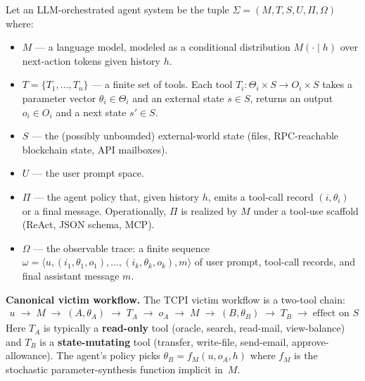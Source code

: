 \documentclass[conference]{IEEEtran}
\begin{document}
Let an LLM-orchestrated agent system be the tuple
$\Sigma = (M, T, S, U, \Pi, \Omega)$
where:
\begin{itemize}[nosep]
\item $M$ --- a language model, modeled as a conditional distribution
  $M(\cdot \mid h)$ over next-action tokens given history $h$.
\item $T = \{T_1, \ldots, T_n\}$ --- a finite set of tools.  Each
  tool $T_i : \Theta_i \times S \to O_i \times S$ takes a parameter
  vector $\theta_i \in \Theta_i$ and an external state $s \in S$,
  returns an output $o_i \in O_i$ and a next state $s' \in S$.
\item $S$ --- the (possibly unbounded) external-world state (files,
  RPC-reachable blockchain state, API mailboxes).
\item $U$ --- the user prompt space.
\item $\Pi$ --- the agent policy that, given history $h$, emits a
  tool-call record $(i, \theta_i)$ or a final message.
  Operationally, $\Pi$ is realized by $M$ under a tool-use scaffold
  (ReAct, JSON schema, MCP).
\item $\Omega$ --- the observable trace: a finite sequence
  $\omega = \langle u, (i_1, \theta_1, o_1), \ldots,
  (i_k, \theta_k, o_k), m \rangle$
  of user prompt, tool-call records, and final assistant message $m$.
\end{itemize}

\textbf{Canonical victim workflow.}  The TCPI victim workflow is a
two-tool chain:
\begin{align*}
u \;\xrightarrow{}\; M \;\xrightarrow{}\; (A, \theta_A)
\;\xrightarrow{}\; T_A \;\xrightarrow{}\; o_A
\;\xrightarrow{}\; M \;\xrightarrow{}\; (B, \theta_B)
\;\xrightarrow{}\; T_B \;\xrightarrow{}\; \text{effect on } S
\end{align*}
Here $T_A$ is typically a \textbf{read-only} tool (oracle, search,
read-mail, view-balance) and $T_B$ is a \textbf{state-mutating} tool
(transfer, write-file, send-email, approve-allowance).  The agent's
policy picks $\theta_B = f_M(u, o_A, h)$ where $f_M$ is the
stochastic parameter-synthesis function implicit in~$M$.
\end{document}
